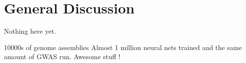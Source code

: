 \chapter{General Discussion} %

\label{Chapter6}

Nothing here yet.

10000s of genome assemblies
Almost 1 million neural nets trained and the same amount of GWAS run.
Awesome stuff ! 
